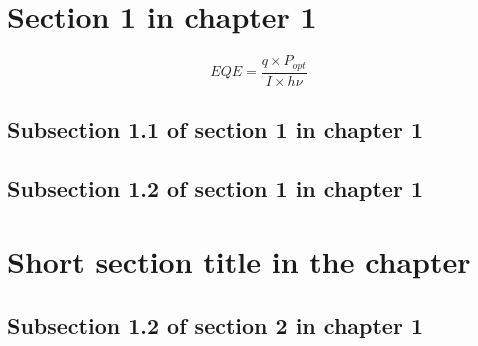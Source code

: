 \section{Section 1 in chapter 1}
\lipsum[2]

\begin{equation}
    EQE = \frac{q \times P_{opt}}{I \times h\nu}
\end{equation}

\lipsum[3-4]

\subsection{Subsection 1.1 of section 1 in chapter 1}
\lipsum[5-7]

\subsection{Subsection 1.2 of section 1 in chapter 1}
\lipsum[8-10]

\clearpage{} %
\section[Long section title displayed in the table of content]{Short section title in the chapter}
\lipsum[11-20]

\subsection{Subsection 1.2 of section 2 in chapter 1}
\lipsum[13-14]


{}
\specialsection %
\headerspecialsection

{\hypersetup{urlcolor=ntnu,linkcolor=sophia} %


}